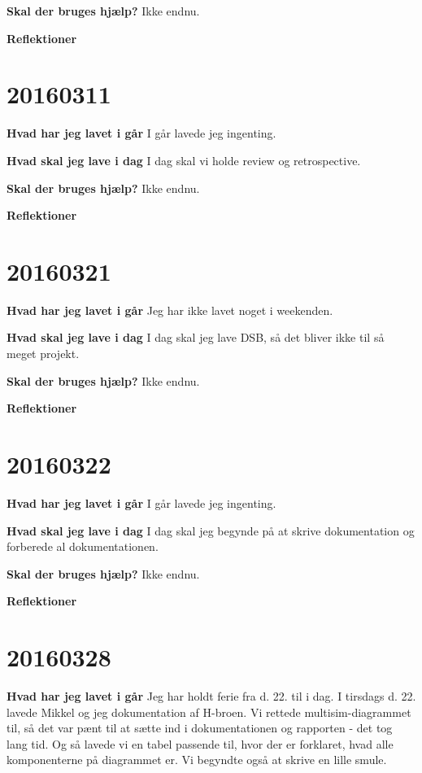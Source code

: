 \documentclass{article}
\begin{document}
	\textbf{Skal der bruges hjælp?}
	Ikke endnu. 
	
	\textbf{Reflektioner}
	
	\section{20160311}
	
	\textbf{Hvad har jeg lavet i går}
	I går lavede jeg ingenting. 
	
	\textbf{Hvad skal jeg lave i dag}
	I dag skal vi holde review og retrospective. 
	
	\textbf{Skal der bruges hjælp?}
	Ikke endnu. 
	
	\textbf{Reflektioner}
	
	\section{20160321}
	
	\textbf{Hvad har jeg lavet i går}
	Jeg har ikke lavet noget i weekenden. 
	
	\textbf{Hvad skal jeg lave i dag}
	I dag skal jeg lave DSB, så det bliver ikke til så meget projekt. 
	
	\textbf{Skal der bruges hjælp?}
	Ikke endnu. 
	
	\textbf{Reflektioner}
	
	\section{20160322}
	
	\textbf{Hvad har jeg lavet i går}
	I går lavede jeg ingenting. 
	
	\textbf{Hvad skal jeg lave i dag}
	I dag skal jeg begynde på at skrive dokumentation og forberede al dokumentationen. 
	
	\textbf{Skal der bruges hjælp?}
	Ikke endnu. 
	
	\textbf{Reflektioner}
	
	\section{20160328}
	
	\textbf{Hvad har jeg lavet i går}
	Jeg har holdt ferie fra d. 22. til i dag. I tirsdags d. 22. lavede Mikkel og jeg dokumentation af H-broen. Vi rettede multisim-diagrammet til, så det var pænt til at sætte ind i dokumentationen og rapporten - det tog lang tid. Og så lavede vi en tabel passende til, hvor der er forklaret, hvad alle komponenterne på diagrammet er. Vi begyndte også at skrive en lille smule. 
	
\end{document}

